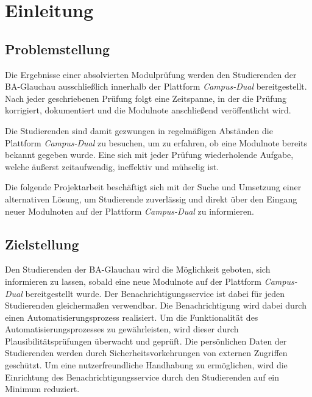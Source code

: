 \chapter{Einleitung}
\section{Problemstellung}
Die Ergebnisse einer absolvierten Modulprüfung werden den Studierenden der BA-Glauchau ausschließlich innerhalb der Plattform \textit{Campus-Dual} bereitgestellt.
Nach jeder geschriebenen Prüfung folgt eine Zeitspanne, in der die Prüfung korrigiert, dokumentiert und die Modulnote anschließend veröffentlicht wird.
 
Die Studierenden sind damit gezwungen in regelmäßigen Abständen die Plattform \textit{Campus-Dual} zu besuchen, um zu erfahren, ob eine Modulnote bereits bekannt gegeben wurde.
Eine sich mit jeder Prüfung wiederholende Aufgabe, welche äußerst zeitaufwendig, ineffektiv und mühselig ist.

Die folgende Projektarbeit beschäftigt sich mit der Suche und Umsetzung einer alternativen Lösung, um Studierende zuverlässig und direkt über den Eingang neuer Modulnoten auf der Plattform \textit{Campus-Dual} zu informieren.

\section{Zielstellung}
Den Studierenden der BA-Glauchau wird die Möglichkeit geboten, sich informieren zu lassen, sobald eine neue Modulnote auf der Plattform \textit{Campus-Dual} bereitgestellt wurde.
Der Benachrichtigungsservice ist dabei für jeden Studierenden gleichermaßen verwendbar.
Die Benachrichtigung wird dabei durch einen Automatisierungsprozess realisiert.
Um die Funktionalität des Automatisierungsprozesses zu gewährleisten, wird dieser durch Plausibilitätsprüfungen überwacht und geprüft.
Die persönlichen Daten der Studierenden werden durch Sicherheitsvorkehrungen von externen Zugriffen geschützt.
Um eine nutzerfreundliche Handhabung zu ermöglichen, wird die Einrichtung des Benachrichtigungsservice durch den Studierenden auf ein Minimum reduziert.